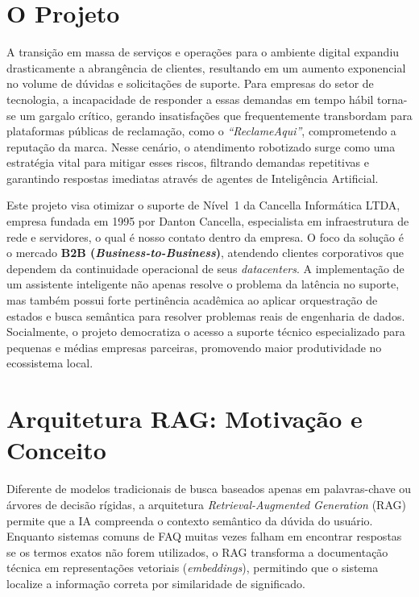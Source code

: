 \documentclass[a4paper,12pt,Times]{article}
\begin{document}

\section{O Projeto}

A transição em massa de serviços e operações para o ambiente digital expandiu drasticamente
a abrangência de clientes, resultando em um aumento exponencial no volume de dúvidas e
solicitações de suporte. Para empresas do setor de tecnologia, a incapacidade de responder
a essas demandas em tempo hábil torna-se um gargalo crítico, gerando insatisfações que
frequentemente transbordam para plataformas públicas de reclamação, como o
\textit{``ReclameAqui''}, comprometendo a reputação da marca. Nesse cenário, o atendimento
robotizado surge como uma estratégia vital para mitigar esses riscos, filtrando demandas
repetitivas e garantindo respostas imediatas através de agentes de Inteligência Artificial.

Este projeto visa otimizar o suporte de Nível~1 da Cancella Informática LTDA, empresa
fundada em 1995 por Danton Cancella, especialista em infraestrutura de rede e servidores,
o qual é nosso contato dentro da empresa. O foco da solução é o mercado \textbf{B2B
(\textit{Business-to-Business})}, atendendo clientes corporativos que dependem da
continuidade operacional de seus \textit{datacenters}. A implementação de um assistente
inteligente não apenas resolve o problema da latência no suporte, mas também possui forte
pertinência acadêmica ao aplicar orquestração de estados e busca semântica para resolver
problemas reais de engenharia de dados. Socialmente, o projeto democratiza o acesso a
suporte técnico especializado para pequenas e médias empresas parceiras, promovendo maior
produtividade no ecossistema local.


\section{Arquitetura RAG: Motivação e Conceito}

Diferente de modelos tradicionais de busca baseados apenas em palavras-chave ou árvores
de decisão rígidas, a arquitetura \textit{Retrieval-Augmented Generation} (RAG) permite
que a IA compreenda o contexto semântico da dúvida do usuário. Enquanto sistemas comuns
de FAQ muitas vezes falham em encontrar respostas se os termos exatos não forem utilizados,
o RAG transforma a documentação técnica em representações vetoriais (\textit{embeddings}),
permitindo que o sistema localize a informação correta por similaridade de significado.
\end{document}
